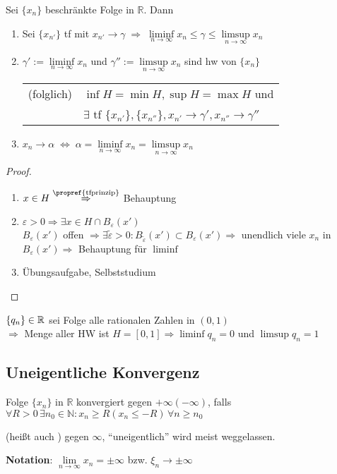 \begin{proposition}
	Sei $\{x_n\}$ beschränkte Folge in $\mathbb{R}$. Dann
	\begin{enumerate}[label={\arabic*)}]
		\item Sei $\{x_{n'}\}$ \gls{tf} mit $x_{n'}\rightarrow\gamma \;\Rightarrow \;\liminf\limits_{n\rightarrow\infty} x_n \le \gamma \le \limsup\limits_{n\rightarrow\infty} x_n$
		\item $\gamma' :=\liminf\limits_{n\rightarrow\infty} x_n$ und $\gamma'' := \limsup\limits_{n\rightarrow\infty} x_n$ sind \gls{hw} von $\{x_n\}$
		
		\begin{tabular}{ll}
		(folglich)& $\inf H = \min H, \sup H = \max H$ und \\
		& $\exists$ \gls{tf} $\{x_{n'}\}, \{x_{n''}\}, x_{n'}\rightarrow \gamma', x_{n''}\rightarrow\gamma''$
		\end{tabular}
		\item $x_n\rightarrow \alpha \;\Leftrightarrow \;\alpha = \liminf\limits_{n\rightarrow\infty} x_n = \limsup\limits_{n\rightarrow\infty} x_n$
	\end{enumerate}
\end{proposition}
\begin{proof}
	\begin{enumerate}
		\item $x\in H\overset{\text{\propref{tfprinzip}}}{\Rightarrow}$ Behauptung
		\item $\varepsilon>0\Rightarrow\exists x\in H\cap B_{\varepsilon}(x')$ \\
		$B_{\varepsilon}(x')$ offen $\Rightarrow\exists\tilde{\varepsilon}>0:B_{\tilde{\varepsilon}}(x')\subset B_{\varepsilon}(x')\Rightarrow$ unendlich viele $x_n$ in $B_{\varepsilon}(x')\Rightarrow$ Behauptung für $\liminf$
		\item Übungsaufgabe, Selbststudium
	\end{enumerate}
\end{proof}

\begin{example}
	$\{q_n\}\in\mathbb{R}$ sei Folge alle rationalen Zahlen in $(0,1)$ \\
	$\Rightarrow$ Menge aller HW ist $H=[0,1]\Rightarrow \liminf q_n=0$ und $\limsup q_n=1$
\end{example}

\subsection{Uneigentliche Konvergenz}
\begin{definition}
	Folge $\{x_n\}$ in $\mathbb{R}$ konvergiert  gegen $+\infty (-\infty)$, falls $\forall R>0\,\exists n_0\in\mathbb{N}: x_n \ge R (x_n \le -R)\,\forall n\ge n_0$
	
	(heißt auch ) gegen $\infty$, "`uneigentlich"' wird meist weggelassen.
	
	\textbf{Notation}: $\lim\limits_{n\rightarrow\infty} x_n = \pm \infty$ bzw. $\xi_n\rightarrow \pm \infty$
\end{definition}

